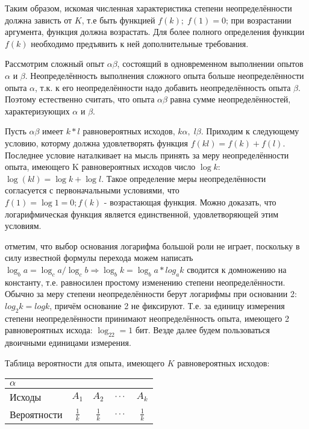 ﻿\documentclass[a4paper,12pt]{report}
\begin{document}
	Таким образом, искомая численная характеристика степени неопределённости должна зависть от $K$, т.е быть функцией $f(k); \; f(1)=0$; при возрастании аргумента, функция должна возрастать. Для более полного определения функции $f(k)$ необходимо предъявить к ней дополнительные требования. 
	
	Рассмотрим сложный опыт $\alpha\beta$, состоящий в одновременном выполнении опытов $\alpha$ и $\beta$. Неопределённость выполнения сложного опыта больше неопределённости опыта $\alpha$, т.к. к его неопределённости надо добавить неопределённость опыта $\beta$. Поэтому естественно считать, что  опыта $\alpha\beta$ равна сумме неопределённостей, характеризующих $\alpha$ и $\beta$.
	
	Пусть $\alpha \beta$ имеет $k*l$ равновероятных исходов, $k\alpha, \; l\beta$. Приходим к следующему условию, которму должна удовлетворять функция $f(kl) = f(k) + f(l)$. Последнее условие наталкивает на мысль принять за меру неопределённости опыта, имеющего K равновероятных исходов число $\log k$: $\log(kl) = \log k + \log l$. Такое определение меры неопределённости согласуется с первоначальными условиями, что $f(1) = \log1 = 0; f(k) \mbox{ - возрастающая функция}$. Можно доказать, что логарифмическая функция является единственной, удовлетворяющей этим условиям.


 	 отметим, что выбор основания логарифма большой роли не играет, поскольку в силу известной формулы перехода можем написать $\log_ba = \log_ca/\log_cb \Rightarrow \log_bk = \log_ba*log_ak$ сводится к домножению на константу, т.е. равносилен простому изменению  степени неопределённости. Обычно за меру степени неопределённости берут логарифмы при основании 2: $log_2k = logk$, причём основание 2 не фиксируют. Т.е. за единицу измерения степени неопределённости принимают неопределённость опыта, имеющего 2 равновероятных исхода: $\log_22 = 1$ бит. Везде далее будем пользоваться двоичными единицами измерения. 

	Таблица вероятности для опыта, имеющего $K$ равновероятных исходов:
	

	\begin{tabular}{|l|c|c|c|c|}
	\hline
		$\alpha$ &&&&\\
	\hline
		Исходы & $A_1$ & $A_2$ & $\,\ldots\,$ & $A_k$ \\
	\hline
		Вероятности& $\frac{1}{k}$& $\frac{1}{k}$ & $\,\ldots\,$ & $\frac{1}{k}$\\
	\hline
	\end{tabular}
\end{document}

